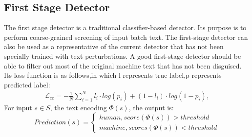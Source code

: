 \documentclass[11pt]{article}
\begin{document}
	\subsection{First Stage Detector}
	\label{sec:first_stage}
	The first stage detector is a traditional classifier-based detector. Its purpose is to perform coarse-grained screening of input batch text. The first-stage detector can also be used as a representative of the current detector that has not been specially trained with text perturbations. A good first-stage detector should be able to filter out most of the original machine text that has not been disguised. Its loss function is as follows,in which l represents true label,p represents predicted label:
  \begin{equation}
    \begin{aligned}
        \label{eq:loss_ce}
        \mathcal L_{ce}=-\frac{1}{N}\displaystyle\sum_{i=1}^N l_i\cdot log(p_i)+(1-l_i)\cdot log(1-p_i),
    \end{aligned}
\end{equation}
For input $s \in S$, the text encoding $\Phi(s)$, the output is:
\begin{equation}
	\label{ineq:seq_equal}
		Prediction(s) = 
		\begin{cases}
			human, score(\Phi(s))>threshold \\
			machine, scores(\Phi(s)) < threshold
		\end{cases}
	\end{equation}

	
\end{document}
